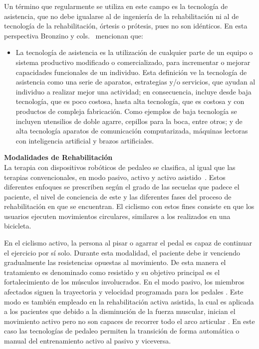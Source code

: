 Un término que regularmente se utiliza en este campo es la tecnología de asistencia, que no debe igualarse al de ingeniería de la rehabilitación ni al de tecnología de la rehabilitación, órtesis o prótesis, pues no son idénticos. En esta perspectiva Bronzino y cols.~\cite{enderle2012introduction} mencionan que:

\begin{itemize}
    \item  La tecnología de asistencia es la utilización de cualquier parte de un equipo o sistema productivo modificado o comercializado, para incrementar o mejorar capacidades funcionales de un individuo. Esta definición ve la tecnología de asistencia como una serie de aparatos, estrategias y/o servicios, que ayudan al individuo a realizar mejor una actividad; en consecuencia, incluye desde baja tecnología, que es poco costosa, hasta alta tecnología, que es costosa y con productos de compleja fabricación. Como ejemplos de baja tecnología se incluyen utensilios de doble agarre, cepillos para la boca, entre otros; y de alta tecnología aparatos de comunicación computarizada, máquinas lectoras con inteligencia artificial y brazos artificiales.
\end{itemize}

\textbf{Modalidades de Rehabilitación} \\ 
La terapia con dispositivos robóticos de pedaleo se clasifica, al igual que las terapias convencionales, en modo pasivo, activo y activo asistido~\cite{barclay2019effect}. Estos diferentes enfoques se prescriben según el grado de las secuelas que padece el paciente, el nivel de conciencia de este y las diferentes fases del proceso de rehabilitación en que se encuentran. El ciclismo con estos fines consiste en que los usuarios ejecuten movimientos circulares, similares a los realizados en una bicicleta.

En el ciclismo activo, la persona al pisar o agarrar el pedal es capaz de continuar el ejercicio por sí solo. Durante esta modalidad, el paciente debe ir venciendo gradualmente las resistencias opuestas al movimiento. De esta manera el tratamiento es denominado como resistido y su objetivo principal es el fortalecimiento de los músculos involucrados. En el modo pasivo, los miembros afectados siguen la trayectoria y velocidad programada para los pedales \cite{ferreira2020virtual}. Este modo es también empleado en la rehabilitación activa asistida, la cual es aplicada a los pacientes que debido a la disminución de la fuerza muscular, inician el movimiento activo pero no son capaces de recorrer todo el arco articular \cite{cruz2009guia}. En este caso las tecnologías de pedaleo permiten la transición de forma automática o manual del entrenamiento activo al pasivo y viceversa.

